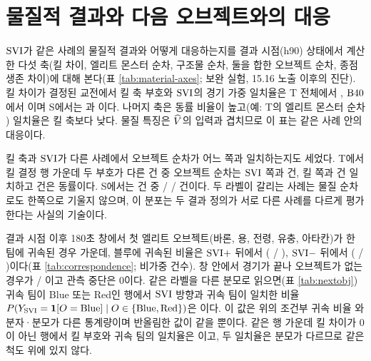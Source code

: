 \section{물질적 결과와 다음 오브젝트와의 대응}
\label{sec:value-correspondence}

$\mathrm{SVI}$가 같은 사례의 물질적 결과와 어떻게 대응하는지를 결과 시점(h90) 상태에서 계산한 다섯 축(킬 차이, 엘리트 몬스터 순차, 구조물 순차, 둘을 합한 오브젝트 순차, 종점 생존 차이)에 대해 본다(표 \ref{tab:material-axes}; 보완 실험, 15.16 노출 이후의 진단). 킬 차이가 결정된 교전에서 킬 축 부호와 $\mathrm{SVI}$의 경기 가중 일치율은 T 전체에서 \maTKillAllAgree{}, $\mathrm{B40}$에서 \maTKillBfortyAgree{}이며 S에서는 \maSKillAllAgree{}과 \maSKillBfortyAgree{}이다. 나머지 축은 동률 비율이 높고(예: T의 엘리트 몬스터 순차 \maTEpicAllTie{}) 일치율은 킬 축보다 낮다. 물질 특징은 $\widehat V$의 입력과 겹치므로 이 표는 같은 사례 안의 대응이다.



킬 축과 $\mathrm{SVI}$가 다른 사례에서 오브젝트 순차가 어느 쪽과 일치하는지도 세었다. T에서 킬 결정 행 가운데 두 부호가 다른 \kdTN{}건 중 오브젝트 순차는 $\mathrm{SVI}$ 쪽과 \kdTSvi{}건, 킬 쪽과 \kdTKill{}건 일치하고 \kdTTie{}건은 동률이다. S에서는 \kdSN{}건 중 \kdSSvi{} / \kdSKill{} / \kdSTie{}건이다. 두 라벨이 갈리는 사례는 물질 순차로도 한쪽으로 기울지 않으며, 이 분포는 두 결과 정의가 서로 다른 사례를 다르게 평가한다는 사실의 기술이다.

결과 시점 이후 180초 창에서 첫 엘리트 오브젝트(바론, 용, 전령, 유충, 아타칸)가 한 팀에 귀속된 경우 가운데, 블루에 귀속된 비율은 $\mathrm{SVI}+$ 뒤에서 \objBluePos{}(\objBluePosNum{} / \objBluePosDen{}), $\mathrm{SVI}-$ 뒤에서 \objBlueNeg{}(\objBlueNegNum{} / \objBlueNegDen{})이다(표 \ref{tab:correspondence}; 비가중 건수). 창 안에서 경기가 끝나 오브젝트가 없는 경우가 \objGameEnded{} / \numTTest{}이고 관측 중단은 0이다. 같은 라벨을 다른 분모로 읽으면(표 \ref{tab:nextobj}) 귀속 팀이 Blue 또는 Red인 \noAllNBR{}행에서 $\mathrm{SVI}$ 방향과 귀속 팀이 일치한 비율 $P(Y_{\mathrm{SVI}} = \mathbf{1}[O = \mathrm{Blue}] \mid O \in \{\mathrm{Blue}, \mathrm{Red}\})$은 \noAllSviAgree{}이다. 이 값은 위의 조건부 귀속 비율 \objBluePos{}와 분자·분모가 다른 통계량이며 반올림한 값이 같을 뿐이다. 같은 행 가운데 킬 차이가 0이 아닌 \noAllNKill{}행에서 킬 부호와 귀속 팀의 일치율은 \noAllKillAgree{}이고, 두 일치율은 분모가 다르므로 같은 척도 위에 있지 않다.



